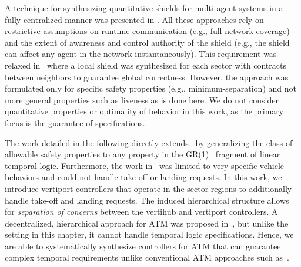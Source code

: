 A technique for synthesizing quantitative shields for multi-agent systems in a fully centralized manner was presented in \cite{multiagentshield}. All these approaches rely on restrictive assumptions on runtime communication (e.g., full network coverage) and the extent of awareness and control authority of the shield (e.g., the shield can affect any agent in the network instantaneously). This requirement was relaxed in~\cite{bhnfm} where a local shield was synthesized for each sector with contracts between neighbors to guarantee global correctness. However, the approach was formulated only for specific safety properties (e.g., minimum-separation) and not more general properties such as liveness as is done here. We do not consider quantitative properties or optimality of behavior in this work, as the primary focus is the guarantee of specifications.

The work detailed in the following directly extends~\cite{bhnfm} by generalizing the class of allowable safety properties to any property in the GR(1)~\cite{bloem2012} fragment of linear temporal logic. Furthermore, the work in~\cite{bhnfm} was limited to very specific vehicle behaviors and could not handle take-off or landing requests. In this work, we introduce vertiport controllers that operate in the sector regions to additionally handle take-off and landing requests. The induced hierarchical structure allows for \emph{separation of concerns} between the vertihub and vertiport controllers. A decentralized, hierarchical approach for ATM was proposed in~\cite{6011668}, but unlike the setting in this chapter, it cannot handle temporal logic specifications. Hence, we are able to systematically synthesize controllers for ATM that can guarantee complex temporal requirements unlike conventional ATM approaches such as~\cite{6011668}. 
